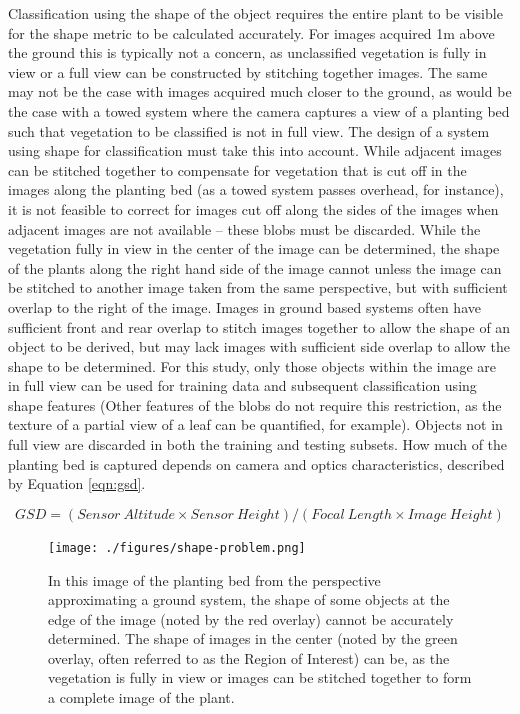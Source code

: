 \documentclass[letterpaper, notitlepage]{report}
\begin{document}
Classification using the shape of the object requires  the entire plant to be visible for the shape metric to be calculated accurately. For images acquired 1m above the ground this is typically not a concern, as unclassified vegetation is fully in view or a full view can be constructed by stitching together images. The same may not be the case with images acquired much closer to the ground, as would be the case with a towed system where the camera captures a view of a planting bed such that vegetation to be classified is not in full view. The design of a system using shape for classification must take this into account. While adjacent images can be stitched together to compensate for vegetation that is cut off in the images along the planting bed (as a towed system passes overhead, for instance), it is not feasible to correct for images cut off along the sides of the images when adjacent images are not available -- these blobs must be discarded. While the vegetation fully in view in the center of the image can be determined, the shape of the plants along the right hand side of the image cannot unless the image can be stitched to another image taken from the same perspective, but with sufficient overlap to the right of the image. Images in ground based systems often have sufficient front and rear overlap to stitch images together to allow the shape of an object to be derived, but may lack images with sufficient side overlap to allow the shape to be determined. For this study, only those objects within the image are in full view can be used for training data and subsequent classification using shape features (Other features of the blobs do not require this restriction, as the texture of a partial  view of a leaf can be quantified, for example). Objects not in full view are discarded in both the training and testing subsets. How much of the planting bed is captured depends on camera and 
optics characteristics, described by Equation \ref{eqn:gsd}.

\begin{equation}
\label{eqn:gsd}
GSD = (Sensor\ Altitude \times Sensor\ Height) / (Focal\ Length \times Image\ Height)
\end{equation}

 \begin{figure}[H]
	\centering
	\texttt{[image: ./figures/shape-problem.png]}
	\caption[Shape of some objects cannot be determined]{In this image of the planting bed from the perspective approximating a ground system, the shape of some objects at the edge of the image (noted by the red overlay) cannot be accurately determined. The shape of images in the center (noted by the green overlay, often referred to as the Region of Interest) can be, as the vegetation is fully in view or images can be stitched together to form a complete image of the plant.}
	\label{fig:shape-problem}
\end{figure}
\end{document}
